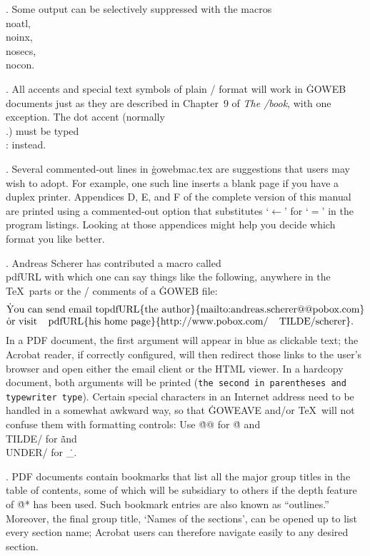 . Some output can be selectively suppressed with the macros
\.{\\noatl}, \.{\\noinx}, \.{\\nosecs}, \.{\\nocon}.

. All accents and special text symbols of plain \TEX/ format
will work in \.{GOWEB} documents just as they are described in
Chapter~9 of {\sl The \TEX/book}, with one exception.
The dot accent (normally \.{\\.}) must be typed \.{\\:} instead.

. Several commented-out lines in \.{gowebmac.tex} are suggestions
that users may wish to adopt. For example, one such line inserts a blank page
if you have a duplex printer. Appendices D, E, and F of the complete
version of this manual are printed using a commented-out option that
substitutes `$\gets$' for `$=$' in the program listings. Looking at those
appendices might help you decide which format you like better.

. Andreas Scherer has contributed a macro called \.{\\pdfURL}
with which one can say things like the following, anywhere in the \TeX\ parts
or the \GO/ comments of a \.{GOWEB} file:
$$\vbox{\halign{\.{#}\hfil\cr
You can send email to
 \\pdfURL\{the author\}\{mailto:andreas.scherer@@pobox.com\}\cr
or visit \\pdfURL\{his home page\}\{http://www.pobox.com/%
       \\TILDE/scherer\}.\cr}}$$
In a {\mc PDF} document, the first argument will appear in blue as
clickable text; the Acrobat reader, if correctly configured, will then
redirect those links to the user's browser and open either the
email client or the HTML viewer. In a hardcopy document, both arguments
will be printed ({\tt the second in parentheses and typewriter type}).
Certain special characters in an Internet address need to be handled
in a somewhat awkward way, so that \.{GOWEAVE} and/or \TeX\
will not confuse them with formatting controls: Use \.{@@} for \.@
and \.{\\TILDE/} for \.\~ and \.{\\UNDER/} for \.\_.

. {\mc PDF} documents contain bookmarks that list all the major group
titles in the table of contents, some of which will be subsidiary to
others if the depth feature of \.{@*} has been used.
Such bookmark entries are also known as ``outlines.''
Moreover, the final group title, `Names of the sections',
can be opened up to list every section name; Acrobat users can therefore
navigate easily to any desired section.

